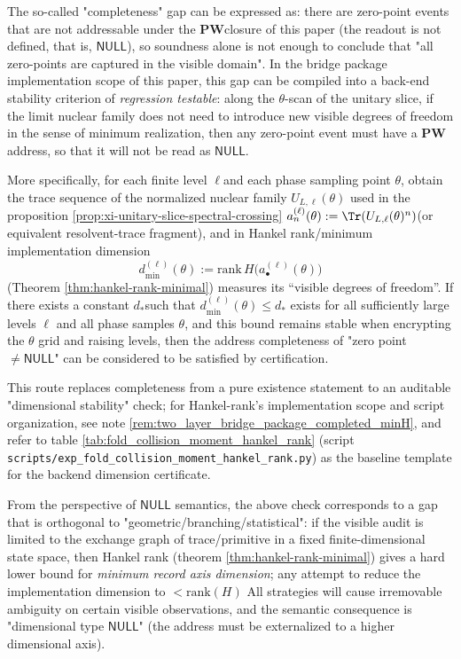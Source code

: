 \begin{remark}\label{rem:xi-acc-rank}
The so-called "completeness" gap can be expressed as: there are zero-point events that are not addressable under the \(\mathbf{PW}\) ​​closure of this paper (the readout is not defined, that is, \(\mathsf{NULL}\)), so soundness alone is not enough to conclude that "all zero-points are captured in the visible domain".
In the bridge package implementation scope of this paper, this gap can be compiled into a back-end stability criterion of \emph{regression testable}: along the \(\theta\)-scan of the unitary slice, if the limit nuclear family does not need to introduce new visible degrees of freedom in the sense of minimum realization, then any zero-point event must have a \(\mathbf{PW}\) address, so that it will not be read as \(\mathsf{NULL}\).
\par
More specifically, for each finite level \(\ell\) ​​and each phase sampling point \(\theta\), obtain the trace sequence of the normalized nuclear family \(U_{L,\ell}(\theta)\) used in the proposition \ref{prop:xi-unitary-slice-spectral-crossing}
\(
a^{(\ell)}_n(\theta):=\Tr(U_{L,\ell}(\theta)^n)
\) ​​(or equivalent resolvent-trace fragment), and in Hankel rank/minimum implementation dimension
\[
d^{(\ell)}_{\min}(\theta):=\mathrm{rank}\,H\!\bigl(a^{(\ell)}_\bullet(\theta)\bigr)
\]
(Theorem \ref{thm:hankel-rank-minimal}) measures its “visible degrees of freedom”.
If there exists a constant \(d_\ast\) ​​such that \(d^{(\ell)}_{\min}(\theta)\le d_\ast\) exists for all sufficiently large levels \(\ell\) and all phase samples \(\theta\), and this bound remains stable when encrypting the \(\theta\) grid and raising levels, then the address completeness of "zero point \(\neq\mathsf{NULL}\)" can be considered to be satisfied by certification.
\par
This route replaces completeness from a pure existence statement to an auditable "dimensional stability" check; for Hankel-rank's implementation scope and script organization, see note \ref{rem:two_layer_bridge_package_completed_minH}, and refer to table \ref{tab:fold_collision_moment_hankel_rank} (script \texttt{scripts/exp\_fold\_collision\_moment\_hankel\_rank.py}) as the baseline template for the backend dimension certificate.
\par
From the perspective of \(\mathsf{NULL}\) semantics, the above check corresponds to a gap that is orthogonal to "geometric/branching/statistical": if the visible audit is limited to the exchange graph of trace/primitive in a fixed finite-dimensional state space, then Hankel rank (theorem \ref{thm:hankel-rank-minimal}) gives a hard lower bound for \emph{minimum record axis dimension}; any attempt to reduce the implementation dimension to \(<\mathrm{rank}(H)\) All strategies will cause irremovable ambiguity on certain visible observations, and the semantic consequence is "dimensional type \(\mathsf{NULL}\)" (the address must be externalized to a higher dimensional axis).

\end{remark}
